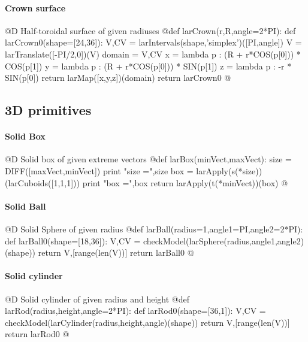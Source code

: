 \documentclass[11pt,oneside]{article}	%
\begin{document}
\paragraph{Crown surface}
@D Half-toroidal surface of given radiuses
@{def larCrown(r,R,angle=2*PI):
	def larCrown0(shape=[24,36]):
		V,CV = larIntervals(shape,'simplex')([PI,angle])
		V = larTranslate([-PI/2,0])(V)
		domain = V,CV
		x = lambda p : (R + r*COS(p[0])) * COS(p[1])
		y = lambda p : (R + r*COS(p[0])) * SIN(p[1])
		z = lambda p : -r * SIN(p[0])
		return larMap([x,y,z])(domain)
	return larCrown0
@}

\subsection{3D primitives}


\paragraph{Solid Box}
@D Solid box of given extreme vectors
@{def larBox(minVect,maxVect):
	size = DIFF([maxVect,minVect])
	print "size =",size
	box = larApply(s(*size))(larCuboids([1,1,1]))
	print "box =",box
	return larApply(t(*minVect))(box)
@}


\paragraph{Solid Ball}
@D Solid Sphere of given radius
@{def larBall(radius=1,angle1=PI,angle2=2*PI):
	def larBall0(shape=[18,36]):
		V,CV = checkModel(larSphere(radius,angle1,angle2)(shape))
		return V,[range(len(V))]
	return larBall0
@}

\paragraph{Solid cylinder}
@D Solid cylinder of given radius and height
@{def larRod(radius,height,angle=2*PI):
	def larRod0(shape=[36,1]):
		V,CV = checkModel(larCylinder(radius,height,angle)(shape))
		return V,[range(len(V))]
	return larRod0
@}
\end{document}
